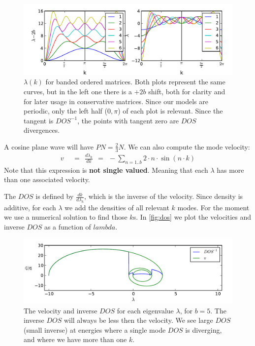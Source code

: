 \documentclass[onecolumn,fleqn,longbibliography]{revtex4}
\begin{document}
\begin{figure}[H]
    \includegraphics{pta_theor_banded_ev}
    \caption{$\lambda(k)$ for banded ordered matrices. Both plots
    represent the same curves, but in the left one there is a $+2b$ shift, both for clarity 
    and for later usage in conservative matrices. Since our 
    models are periodic, only the left half ($0,\pi$) of each plot is relevant. Since 
    the tangent is $DOS^{-1}$, the points with tangent zero are $DOS$ divergences.
    }
    \label{fig:theor_banded_ev}
\end{figure}



A cosine plane wave will have $PN= \frac{2}{3}N$. We can also compute the mode velocity:
\begin{align}
v \ \ &=\ \ \frac{d\lambda_k}{dk} \ \ =\ \ -\sum_{n=1..b} 2\cdot n\cdot \sin(n\cdot k)
\end{align}
Note that this expression is {\bf not single valued}. Meaning that each $\lambda$ 
has more than one associated velocity. 


The $DOS$ is defined by $\frac{dk}{d\lambda_k}$, which is the inverse of the 
velocity. Since density is additive, for each $\lambda$ we add the densities
of all relevant $k$ modes. For the moment we use a numerical solution to
find those $k$s. In \autoref{fig:dos} we plot the velocities and inverse 
$DOS$ as a function of $lambda$.
\begin{figure}[H]
    \includegraphics{pta_theor_banded_dos}
    \caption{The velocity and inverse $DOS$ for each eigenvalue $\lambda$, for $b=5$. 
             The inverse $DOS$ will always be less then the velocity. 
             We see large $DOS$ (small inverse) at energies where a single
             mode $DOS$ is diverging, and where we have more than one $k$.}
    \label{fig:dos}
\end{figure}
\end{document}
